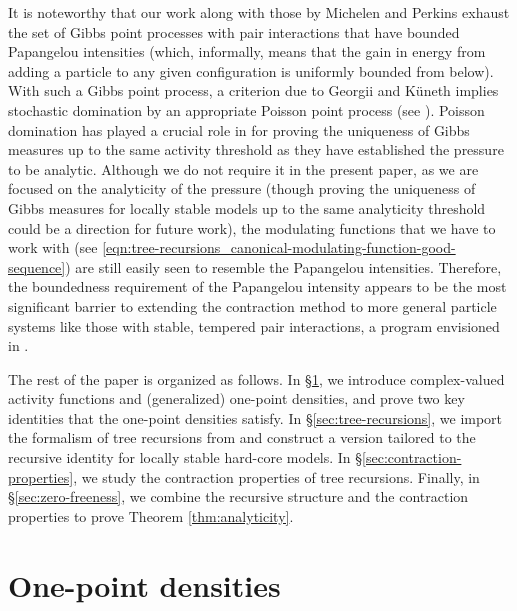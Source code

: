 \documentclass[11pt]{article}
\numberwithin{equation}{section}
\theoremstyle{plain}
\theoremstyle{definition}
\theoremstyle{remark}
\begin{document}
It is noteworthy that our work along with those by Michelen and Perkins \cite{michelen2021potential,michelen2023analyticity} exhaust the set of Gibbs point processes with pair interactions that have bounded Papangelou intensities (which, informally, means that the gain in energy from adding a particle to any given configuration is uniformly bounded from below).
With such a Gibbs point process, a criterion due to Georgii and K\"uneth \cite{georgii1997stochastic} implies stochastic domination by an appropriate Poisson point process (see \cite[Example 2.2]{georgii1997stochastic}).
Poisson domination has played a crucial role in \cite{michelen2021potential,michelen2023analyticity} for proving the uniqueness of Gibbs measures up to the same activity threshold as they have established the pressure to be analytic.
Although we do not require it in the present paper, as we are focused on the analyticity of the pressure (though proving the uniqueness of Gibbs measures for locally stable models up to the same analyticity threshold could be a direction for future work), the modulating functions that we have to work with (see \eqref{eqn:tree-recursions_canonical-modulating-function-good-sequence}) are still easily seen to resemble the Papangelou intensities.
Therefore, the boundedness requirement of the Papangelou intensity appears to be the most significant barrier to extending the contraction method to more general particle systems like those with stable, tempered pair interactions, a program envisioned in \cite{anand2023perfect}.

\bigskip

The rest of the paper is organized as follows.
In \S\ref{sec:one-point-densities}, we introduce complex-valued activity functions and (generalized) one-point densities, and prove two key identities that the one-point densities satisfy.
In \S\ref{sec:tree-recursions}, we import the formalism of tree recursions from \cite{michelen2023analyticity} and construct a version tailored to the recursive identity for locally stable hard-core models.
In \S\ref{sec:contraction-properties}, we study the contraction properties of tree recursions.
Finally, in \S\ref{sec:zero-freeness}, we combine the recursive structure and the contraction properties to prove Theorem \ref{thm:analyticity}.



\section{One-point densities}
\label{sec:one-point-densities}
\end{document}
